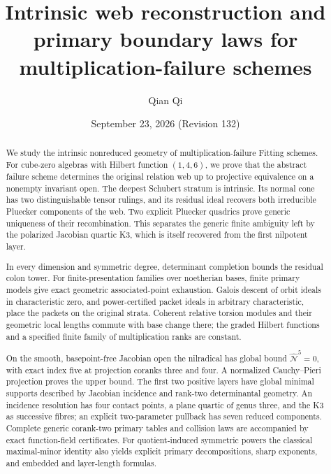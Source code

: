 \title[Web reconstruction and primary boundary laws]{Intrinsic web reconstruction and primary boundary laws for multiplication-failure schemes}
\author{Qian Qi}
\date{September 23, 2026 \quad (Revision 132)}
\begin{abstract}
We study the intrinsic nonreduced geometry of multiplication-failure
Fitting schemes.  For cube-zero algebras with Hilbert function
\((1,4,6)\), we prove that the abstract failure scheme determines
the original relation web up to projective equivalence on a nonempty
invariant open.  The deepest Schubert stratum is intrinsic.  Its
normal cone has two distinguishable tensor rulings, and its residual
ideal recovers both irreducible Pluecker components of the web.
Two explicit Pluecker quadrics prove generic uniqueness of their
recombination.  This separates the generic finite ambiguity left by
the polarized Jacobian quartic K3, which is itself recovered from
the first nilpotent layer.

In every dimension and symmetric degree, determinant completion bounds
the residual colon tower.  For finite-presentation families over
noetherian bases, finite primary models give exact geometric
associated-point exhaustion.  Galois descent of orbit ideals in
characteristic zero, and power-certified packet ideals in arbitrary
characteristic, place the packets on the original strata.  Coherent
relative torsion modules and their geometric local lengths commute
with base change there; the graded Hilbert functions and a specified
finite family of multiplication ranks are constant.

On the smooth, basepoint-free Jacobian open the nilradical has global
bound \(\widehat{\mathcal N}^{5}=0\), with exact index five at
projection coranks three and four.  A normalized Cauchy--Pieri
projection proves the upper bound.  The first two positive layers
have global minimal supports described by Jacobian incidence and
rank-two determinantal geometry.  An incidence resolution has four
contact points, a plane quartic of genus three, and the K3 as
successive fibres; an explicit two-parameter pullback has seven
reduced components.  Complete generic corank-two primary tables and
collision laws are accompanied by exact function-field certificates.
For quotient-induced symmetric powers the classical maximal-minor
identity also yields explicit primary decompositions, sharp exponents,
and embedded and layer-length formulas.
\end{abstract}
\maketitle
